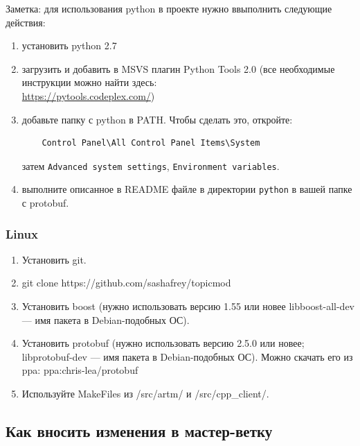 \documentclass[12pt]{article}
\begin{document}
Заметка: для использования python в проекте нужно ввыполнить следующие действия:
\begin{enumerate}
	\item установить python 2.7
	\item загрузить и добавить в MSVS плагин Python Tools 2.0 (все необходимые инструкции можно найти здесь: \\
	\url{https://pytools.codeplex.com/}) \\
	\item добавьте папку с python в PATH. Чтобы сделать это, откройте: \\
\begin{verbatim}
    Control Panel\All Control Panel Items\System
\end{verbatim}	
	затем \verb'Advanced system settings', \verb'Environment variables'.
	\item выполните описанное в README файле в директории \verb'python' в вашей папке с protobuf.
\end{enumerate}

\subsubsection{Linux}

\begin{enumerate}
    \item Установить git.
    \item git clone https://github.com/sashafrey/topicmod
    \item Установить boost (нужно использовать версию 1.55 или новее \hbox{libboost-all-dev} --- имя пакета в Debian-подобных ОС).
    \item Установить protobuf (нужно использовать версию 2.5.0 или новее; \hbox{libprotobuf-dev} --- имя пакета в Debian-подобных ОС). Можно скачать его из ppa: \hbox{ppa:chris-lea/protobuf}
    \item Используйте MakeFiles из /src/artm/ и /src/cpp\_client/.
\end{enumerate}

\subsection{Как вносить изменения в мастер-ветку}\label{label:how_to_submit}
\end{document}

